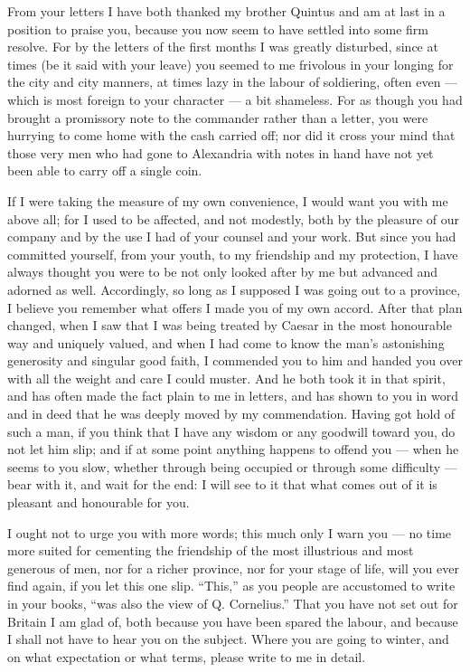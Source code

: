 

 From your letters I have both thanked my brother Quintus and am at last in a position to praise you, because you now seem to have settled into some firm resolve. For by the letters of the first months I was greatly disturbed, since at times (be it said with your leave) you seemed to me frivolous in your longing for the city and city manners, at times lazy in the labour of soldiering, often even --- which is most foreign to your character --- a bit shameless. For as though you had brought a promissory note to the commander rather than a letter, you were hurrying to come home with the cash carried off; nor did it cross your mind that those very men who had gone to Alexandria with notes in hand have not yet been able to carry off a single coin.

 If I were taking the measure of my own convenience, I would want you with me above all; for I used to be affected, and not modestly, both by the pleasure of our company and by the use I had of your counsel and your work. But since you had committed yourself, from your youth, to my friendship and my protection, I have always thought you were to be not only looked after by me but advanced and adorned as well. Accordingly, so long as I supposed I was going out to a province, I believe you remember what offers I made you of my own accord. After that plan changed, when I saw that I was being treated by Caesar in the most honourable way and uniquely valued, and when I had come to know the man's astonishing generosity and singular good faith, I commended you to him and handed you over with all the weight and care I could muster. And he both took it in that spirit, and has often made the fact plain to me in letters, and has shown to you in word and in deed that he was deeply moved by my commendation. Having got hold of such a man, if you think that I have any wisdom or any goodwill toward you, do not let him slip; and if at some point anything happens to offend you --- when he seems to you slow, whether through being occupied or through some difficulty --- bear with it, and wait for the end: I will see to it that what comes out of it is pleasant and honourable for you.

 I ought not to urge you with more words; this much only I warn you --- no time more suited for cementing the friendship of the most illustrious and most generous of men, nor for a richer province, nor for your stage of life, will you ever find again, if you let this one slip. ``This,'' as you people are accustomed to write in your books, ``was also the view of Q. Cornelius.'' That you have not set out for Britain I am glad of, both because you have been spared the labour, and because I shall not have to hear you on the subject. Where you are going to winter, and on what expectation or what terms, please write to me in detail.
